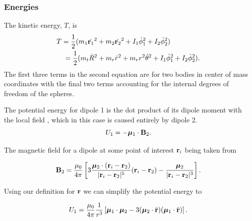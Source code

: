 \documentclass[prbg,preprint]{revtex4-1}
\newcommand{\cvec}[1]{{\rm{\bf{#1}}}}
\begin{document}
\subsubsection{Energies}
The kinetic energy, $T$, is \cite{taylor2005classical}
\begin{equation}
	\begin{multlined}
            T = 
            \frac{1}{2}(
            	m_1 \dot {\cvec{r}_1}^2
            	+m_2 \dot {\cvec{r}_2}^2
            	+ I_1 \dot \phi_1^2
            	+ I_2 \dot \phi_2^2
            )
            \\
            =\frac{1}{2}(
            	m_t \dot R^2
            	+m_r \dot r^2
            	+m_r r^2 \dot \theta^2
            	+ I_1 \dot \phi_1^2
            	+ I_2 \dot \phi_2^2
).
  \end{multlined}
\end{equation}
The first three terms in the second equation are for two bodies in center of mass coordinates with the final two terms accounting for the internal degrees of freedom of the spheres. 

The potential energy for dipole 1 is the dot product of its dipole moment with the local field \cite{Edwards:2017aa}, which in this case is caused entirely by dipole 2.
\begin{equation}
U_1 = -\boldsymbol \mu_1 \cdot \cvec B_2.
\end{equation}

The magnetic field for a dipole at some point of interest $\cvec r_i$ being taken from \cite{griffiths2013introduction}

\begin{equation}
\cvec B_2 = 
\frac{\mu_0}{4\pi}\left[
	3\frac{\boldsymbol \mu_2 \cdot (\cvec r_i - \cvec r_2)}{|\cvec r_i - \cvec r_2|^5}(
	\cvec r_i - \cvec r_2
	)
	-\frac{\boldsymbol \mu_2}{|\cvec r_i - \cvec r_2|^3}
\right].
\end{equation}

Using our definition for $\cvec r$ we can simplify the potential energy to

\begin{equation}
U_1 = 
\frac{\mu_0}{4\pi}
\frac{1}{r^3}\left[
	\boldsymbol \mu_1 \cdot \boldsymbol \mu_2
	-3(
		\boldsymbol \mu_2 \cdot \hat {\cvec r}
		)(
		\boldsymbol \mu_1 \cdot \hat {\cvec r}		
		)
\right].
\end{equation}
\end{document}
